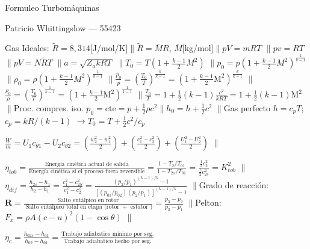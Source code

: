 \documentclass{article}
\newcommand{\cp}{c_p}
\newcommand{\molarmass}{\ensuremath{{\scriptstyle \bar{M}}}}
\newcommand{\Rconst}{R}
\newcommand{\gasconst}{k}
\newcommand{\ctegas}{\gasconst}
\newcommand{\ctan}[1]{\ensuremath{c_{\theta #1}}}
\newcommand{\Mach}{\mathrm{M}}
\newcommand{\cte}{\textrm{cte}}
\newcommand{\dW}{\dot{W}}
\newcommand{\dm}{\dot{m}}
\newcommand{\degreeofreaction}{{\bm{R}}}
\newcommand{\going}{\ensuremath{\rightarrow}}
\newcommand{\separar}{\ensuremath{\pmb{  \parallel{} }}}
\begin{document}
{
\centering
{\large Formuleo Turbomáquinas \par}

{\small Patricio Whittingslow --- 55423\par}
}
\fontsize{10}{0}
\newcommand{\formuleoseparator}{.155cm}
\begin{formuleo}
Gas Ideales: $\tilde{R}=8,314 $[J/mol/K]\separar $\tilde{R}=\molarmass R$, \molarmass [kg/mol]\separar $pV = m R T$ \separar $pv= RT$ \separar $pV = N\tilde{R}T$ \separar $a = \sqrt{Z_a \ctegas RT}$ \separar $T_{0}=T\left(1+\frac{k-1}{2} M^{2}\right)$ \separar $p_{0}=p\left(1+\frac{k-1}{2} M^{2}\right)^{\frac{k}{k-1}}$  \separar $\rho_{0}=\rho\left(1+\frac{k-1}{2} M^{2}\right)^{\frac{1}{k-1}}$ \separar $    \frac{p_0}{p}=\left(\frac{T_0}{T} \right)^{\frac{\gasconst}{\gasconst-1}} =\left(1+ \frac{\gasconst-1}{2}\Mach^2 \right)^{\frac{\gasconst}{\gasconst-1}}$ \separar $    \frac{\rho_0}{\rho}=\left(\frac{T_0}{T} \right)^{\frac{1}{\gasconst-1}} =\left(1+ \frac{\gasconst-1}{2}\Mach^2 \right)^{\frac{1}{\gasconst-1}}$ \separar $\frac{T_0}{T}=1+\tfrac{1}{2}(\gasconst-1)\frac{c^2}{\gasconst\Rconst T}=1+\tfrac{1}{2}(\gasconst-1)\Mach^2$\separar Proc. compres. iso. $p_0=\cte=p+\frac{1}{2}\rho c^2$\separar $h_0=h+\frac{1}{2}c^2$ \separar Gas perfecto $h=\cp T$;  $\cp = \ctegas R/(\ctegas -1)$ \going $T_0=T+\frac{1}{2}c^2/\cp $
\end{formuleo}
\vspace{\formuleoseparator}
\begin{formuleo}
$\frac{\dW}{\dm} = U_1 \ctan{1} - U_2\ctan{2}= \left( \frac{w_2^2-w_1^2}{2} \right)+\left( \frac{c_1^2-c_2^2}{2} \right)+ \left( \frac{U_1^2-U_2^2}{2} \right)$ \separar 

$\eta_{t o b}=\frac{\text {Energía cinética actual de salida}}{\text {Energía cinética si el proceso fuera reversible}} =\frac{1-T_2/T_{01}}{1-T_{2s}/T_{01}}= \frac{\frac{1}{2} c_{2}^{2}}{\frac{1}{2} c_{2 s}^{2}}=K_{t o b}^{2}$ \separar $\eta_{d i f}=\frac{h_{2 s}-h_{1}}{h_{2}-h_{1}}=\frac{c_{1}^{2}-c_{2 S}^{2}}{c_{1}^{2}-c_{2}^{2}}=\frac{(p_2/p_1)^{(\ctegas-1)/\ctegas}-1}{\left[(p_{01}/p_{02})(p_2/p_1) \right]^{(\ctegas-1)/\ctegas}-1}$ \separar Grado de reacción: $\degreeofreaction=\frac{\text { Salto entálpico en rotor }}{\text { Salto entálpico total en etapa (rotor }+\text { estator } )} =\frac{p_{3}-p_{2}}{p_{3}-p_{1}}$ \separar   Pelton: $F_x=\rho A (c-u)^2(1-\cos \theta )$ \separar

$\eta_{c}=\frac{h_{02s}-h_{01}}{h_{02}-h_{01}}= \frac{\text{Trabajo adiabatico mínimo por seg.}}{\text{Trabajo adiabatico hecho por seg.}}$
\end{formuleo}
\end{document}
